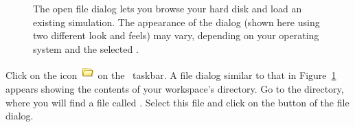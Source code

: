\begin{figure}[htb]
  \centering
  \caption{The open file dialog lets you browse your hard disk and load an existing simulation. The appearance of the dialog 
  (shown here using two different look and feels) may vary, depending on your operating system and the selected .}
  \label{fig:02ExplorationJava/OpenDialog}
\end{figure}

Click on the  icon \includegraphics[scale=\linescale]{../_common/icons_png/openSmall.png} on the \ejs\ taskbar. A file dialog
similar to that in Figure~\ref{fig:02ExplorationJava/OpenDialog} appears showing the contents of your workspace's 
directory. Go to the  directory, where you will find a
file called . Select this file and click on the  button of the
file dialog.

